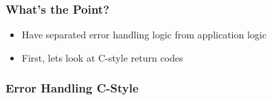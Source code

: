 \begin{Shaded}
\begin{Highlighting}[]
  \NormalTok{; \}}

 
\NormalTok{\{}
  \NormalTok{\{}
     \NormalTok{;}
     
    \NormalTok{\{}
       \NormalTok{);}
    \NormalTok{\}}
  \NormalTok{\}}
   
  \NormalTok{\{}
     
  \NormalTok{\}}
\NormalTok{\}}

\end{Highlighting}
\end{Shaded}

\subsubsection{What's the Point?}\label{whats-the-point}

\begin{itemize}
\itemsep1pt\parskip0pt
\item
  Have separated error handling logic from application logic
\item
  First, lets look at C-style return codes
\end{itemize}

\subsubsection{Error Handling C-Style}\label{error-handling-c-style}

